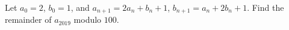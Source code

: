 Let $a_0=2$, $b_0=1$, and $a_{n+1}=2a_n+b_n+1$, $b_{n+1}=a_n+2b_n+1$. Find the remainder of $a_{2019}$ modulo $100$.
